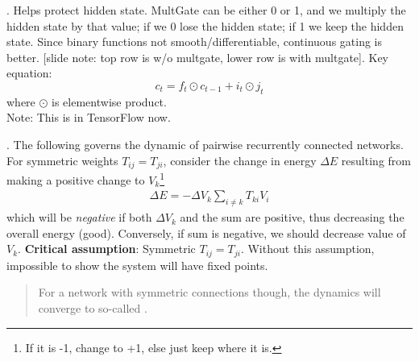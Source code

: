 \documentclass[12pt]{article}
\begin{document}
\p {}. Helps protect hidden state. MultGate can be either 0 or 1, and we multiply the hidden state by that value; if we 0 lose the hidden state; if 1 we keep the hidden state. Since binary functions not smooth/differentiable, continuous gating is better. [slide note: top row is w/o multgate, lower row is with multgate]. Key equation: $$ c_t = f_t \odot c_{t - 1} + i_t \odot j_t$$ where $\odot$ is elementwise product. \\

\p Note: This is in TensorFlow now. 


\p {}. The following governs the dynamic of pairwise recurrently connected networks. 
For symmetric weights $T_{ij} = T_{ji}$, consider the change in energy $\Delta E$ resulting from making a positive change to $V_k$\footnote{If it is -1, change to +1, else just keep where it is.}
\begin{align}
\Delta E = -\Delta V_k \sum_{i \ne k} T_{ki} V_i
\end{align}
which will be \textit{negative} if both $\Delta V_k$ and the sum are positive, thus decreasing the overall energy (good). Conversely, if sum is negative, we should decrease value of $V_k$. \textbf{Critical assumption}: Symmetric $T_{ij} = T_{ji}$. Without this assumption, impossible to show the system will have fixed points. 
\begin{quote}
	For a network with symmetric
	connections though, the dynamics will converge to so-called .
\end{quote}
\myspace
\end{document}
